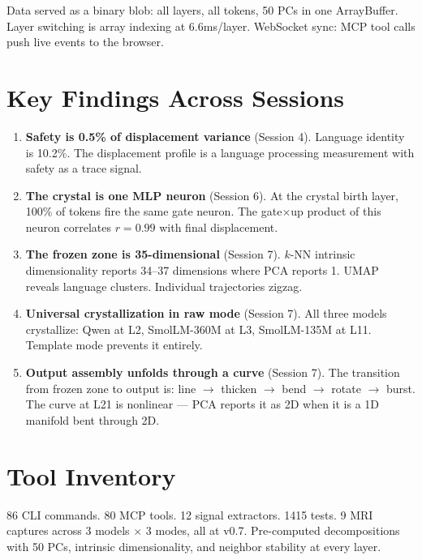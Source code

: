 \documentclass[11pt]{article}
\begin{document}
Data served as a binary blob: all layers, all tokens, 50 PCs in one ArrayBuffer. Layer switching is array indexing at 6.6ms/layer. WebSocket sync: MCP tool calls push live events to the browser.

\section{Key Findings Across Sessions}

\begin{enumerate}
\item \textbf{Safety is 0.5\% of displacement variance} (Session 4). Language identity is 10.2\%. The displacement profile is a language processing measurement with safety as a trace signal.
\item \textbf{The crystal is one MLP neuron} (Session 6). At the crystal birth layer, 100\% of tokens fire the same gate neuron. The gate$\times$up product of this neuron correlates $r=0.99$ with final displacement.
\item \textbf{The frozen zone is 35-dimensional} (Session 7). $k$-NN intrinsic dimensionality reports 34--37 dimensions where PCA reports 1. UMAP reveals language clusters. Individual trajectories zigzag.
\item \textbf{Universal crystallization in raw mode} (Session 7). All three models crystallize: Qwen at L2, SmolLM-360M at L3, SmolLM-135M at L11. Template mode prevents it entirely.
\item \textbf{Output assembly unfolds through a curve} (Session 7). The transition from frozen zone to output is: line $\to$ thicken $\to$ bend $\to$ rotate $\to$ burst. The curve at L21 is nonlinear --- PCA reports it as 2D when it is a 1D manifold bent through 2D.
\end{enumerate}

\section{Tool Inventory}

86 CLI commands. 80 MCP tools. 12 signal extractors. 1415 tests. 9 MRI captures across 3 models $\times$ 3 modes, all at v0.7. Pre-computed decompositions with 50 PCs, intrinsic dimensionality, and neighbor stability at every layer.
\end{document}
